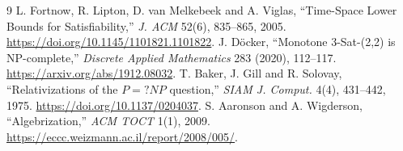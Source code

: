 \documentclass[11pt]{article}
\begin{document}
\begin{thebibliography}{9}
 L. Fortnow, R. Lipton, D. van Melkebeek and A. Viglas,
``Time-Space Lower Bounds for Satisfiability,'' \emph{J. ACM} 52(6),
835--865, 2005. \url{https://doi.org/10.1145/1101821.1101822}.
 J. D\"ocker, ``Monotone 3-Sat-(2,2) is NP-complete,''
\emph{Discrete Applied Mathematics} 283 (2020), 112--117.
\url{https://arxiv.org/abs/1912.08032}.
 T. Baker, J. Gill and R. Solovay,
``Relativizations of the $P=?NP$ question,'' \emph{SIAM J. Comput.} 4(4),
431--442, 1975. \url{https://doi.org/10.1137/0204037}.
 S. Aaronson and A. Wigderson, ``Algebrization,''
\emph{ACM TOCT} 1(1), 2009.
\url{https://eccc.weizmann.ac.il/report/2008/005/}.
\end{thebibliography}

\end{document}
